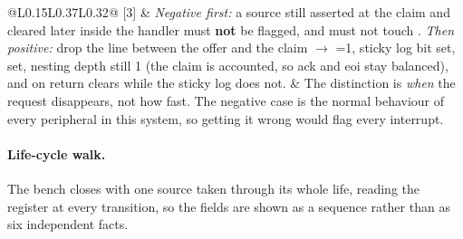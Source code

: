 \begin{table}[H]
\begin{tabular}{@{}L{0.15\linewidth}L{0.37\linewidth}L{0.32\linewidth}@{}}
\midrule
{} [3] &
  \emph{Negative first:} a source still asserted at the claim and cleared later
  inside the handler must \textbf{not} be flagged, and must not touch
  . \emph{Then positive:} drop the line between the offer and
  the claim $\rightarrow$ =1, sticky log bit set,
   set, nesting depth still 1 (the claim is accounted, so
  ack and eoi stay balanced), and on return  clears while the sticky
  log does not. &
  The distinction is \emph{when} the request disappears, not how fast. The
  negative case is the normal behaviour of every peripheral in this system, so
  getting it wrong would flag every interrupt. \\
\bottomrule
\end{tabular}
\end{table}

\paragraph{Life-cycle walk.} The bench closes with one source taken through its
whole life, reading the register at every transition, so the fields are shown as
a sequence rather than as six independent facts.

